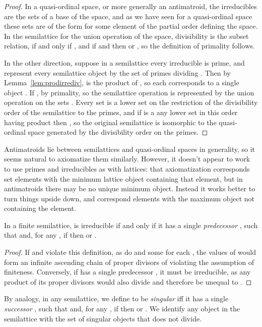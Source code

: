 \documentclass[11pt]{llncs}
\begin{document}
{\begin{proof}
In a quasi-ordinal space, or more generally an antimatroid, the irreducibles are the sets of a base of the space, and as we have seen for a quasi-ordinal space these sets are of the form  for some element  of the partial order defining the space. In the semilattice for the union operation of the space, divisibility is the subset relation,  if and only if , and if  and  then  or , so the definition of primality follows.

In the other direction, suppose in a semilattice every irreducible is prime, and represent every semilattice object  by the set  of primes dividing . Then by Lemma~\ref{lem:prodirrediv},  is the product of , so each  corresponds to a single object .  If ,  by primality, so the semilattice operation is represented by the union operation on the sets . Every set  is a lower set on the restriction of the divisibility order of the semilattice to the primes, and if  is a any lower set in this order having product  then , so the original semilattice is isomorphic to the quasi-ordinal space generated by the divisibility order on the primes.
\end{proof}

Antimatroids lie between semilattices and quasi-ordinal spaces in generality, so it seems natural to axiomatize them similarly. However, it doesn't appear to work to use primes and irreducibles as with lattices: that axiomatization corresponds set elements with the minimum lattice object containing that element, but in antimatroids there may be no unique minimum object. Instead it works better to turn things upside down, and correspond elements with the maximum object not containing the element.

\begin{lemma}
In a finite semilattice,  is irreducible if and only if it has a single \emph{predecessor} , such that  and, for any , if  then  or .
\end{lemma}

\begin{proof}
If  and  violate this definition, as do  and some  for each , the values of  would form an infinite ascending chain of proper divisors of  violating the assumption of finiteness. Conversely, if  has a single predecessor , it must be irreducible, as any product of its proper divisors would also divide  and therefore be unequal to .
\end{proof}

By analogy, in any semilattice, we define  to be \emph{singular} iff it has a single \emph{successor} , such that  and, for any , if  then  or . We identify any object  in the semilattice with the set  of singular objects that  does not divide.

}
\end{document}

